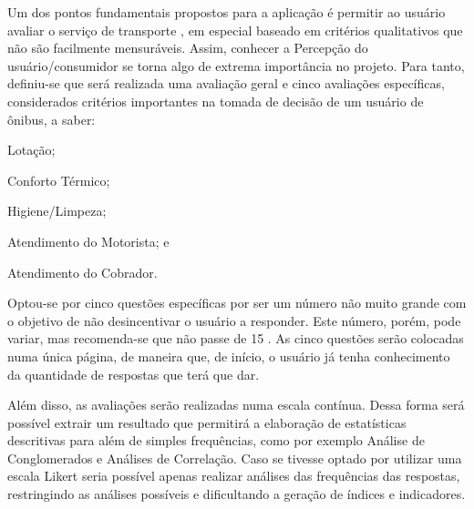 Um dos pontos fundamentais propostos para a aplicação é permitir ao usuário avaliar o serviço de transporte \cite{Lai1995,Almeida2011,Almeida2007,andrade2008constructos}, em especial baseado em critérios qualitativos que não são facilmente mensuráveis. Assim, conhecer a Percepção do usuário/consumidor se torna algo de extrema importância no projeto. Para tanto, definiu-se que será realizada uma avaliação geral e cinco avaliações específicas, considerados critérios importantes na tomada de decisão de um usuário de ônibus, a saber:
\begin{enumerate*}[label=\itshape\alph*\upshape)]
	    \item Lotação;
	    \item Conforto Térmico;
	    \item Higiene/Limpeza;
	    \item Atendimento do Motorista; e
	    \item Atendimento do Cobrador.
\end{enumerate*}
	    
Optou-se por cinco questões específicas por ser um número não muito grande com o objetivo de não desincentivar o usuário a responder. Este número, porém, pode variar, mas recomenda-se que não passe de 15 \cite{teller2013}. As cinco questões serão colocadas numa única página, de maneira que, de início, o usuário já tenha conhecimento da quantidade de respostas que terá que dar.

Além disso, as avaliações serão realizadas numa escala contínua. Dessa forma será possível extrair um resultado que permitirá a elaboração de estatísticas descritivas para além de simples frequências, como por exemplo Análise de Conglomerados e Análises de Correlação. Caso se tivesse optado por utilizar uma escala Likert seria possível apenas realizar análises das frequências das respostas, restringindo as análises possíveis e dificultando a geração de índices e indicadores.\cite{favero2009}

